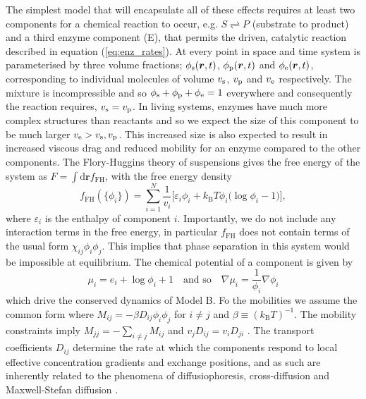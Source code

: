 The simplest model that will encapsulate all of these effects requires at least two components for a chemical reaction to occur, e.g. $S \rightleftharpoons P$ (substrate to product) and a third enzyme component (E), that permits the driven, catalytic reaction described in equation (\ref{eq:enz_rates}). At every point in space and time system is parameterised by three volume fractions; $\phi_{\mathrm{s}}(\bm{r},t)$, $\phi_{\mathrm{p}}(\bm{r},t)$ and $\phi_{\mathrm{e}}(\bm{r},t)$, corresponding to individual molecules of volume $v_{\mathrm{s}}$, $v_{\mathrm{p}}$ and $v_{\mathrm{e}}$ respectively. The mixture is incompressible and so $\phi_{\mathrm{s}}+\phi_{\mathrm{p}}+\phi_{\mathrm{e}}=1$ everywhere and consequently the reaction requires, $v_{\mathrm{s}} = v_{\mathrm{p}}$. In living systems, enzymes have much more complex structures than reactants and so we expect the size of this component to be much larger $v_{\mathrm{e}} > v_{\mathrm{s}}, v_{\mathrm{p}}$\cite{berg_biochemistry_2002}. This increased size is also expected to result in increased viscous drag and reduced mobility for an enzyme compared to the other components. The Flory-Huggins theory of suspensions gives the free energy of the system as $F = \int \mathrm{d}\bm{r} f_\mathrm{FH}$, with the free energy density
\begin{equation}
    f_\mathrm{FH}(\{\phi_i\}) = \sum_{i=1}^{N} \frac{1}{v_i} \big[\varepsilon_i\phi_i + k_\mathrm{B}T \phi_i \big(\log\phi_i-1\big) \big], 
    \label{eq:fh_gen}
\end{equation}
where $\varepsilon_i$ is the enthalpy of component $i$. Importantly, we do not include any interaction terms in the free energy, in particular $f_\mathrm{FH}$ does not contain terms of the usual form $\chi_{ij}\phi_i \phi_j$. This implies that phase separation in this system would be impossible at equilibrium. The chemical potential of a component is given by
\begin{equation}
    \mu_i = e_i + \log\phi_i + 1 \quad \text{and so} \quad \nabla\mu_i = \frac{1}{\phi_i}\nabla\phi_i
    \label{eq:chempot}
\end{equation}
which drive the conserved dynamics of Model B. Fo the mobilities we assume the common form where $M_{ij} = -\beta D_{ij}\phi_i\phi_j$ for $i \neq j$ and $\beta \equiv (k_\mathrm{B}T)^{-1}$. The mobility constraints imply $M_{jj}= - \sum_{i\neq j} M_{ij}$ and $v_j D_{ij} = v_i D_{ji}$ \cite{KRAMER1984473, kehr_mobility_1989, mao_designing_2020, bo_stochastic_2021}. The transport coefficients $D_{ij}$ determine the rate at which the components respond to local effective concentration gradients and exchange positions, and as such are inherently related to the phenomena of diffusiophoresis, cross-diffusion and Maxwell-Stefan diffusion \cite{suppmat}.

